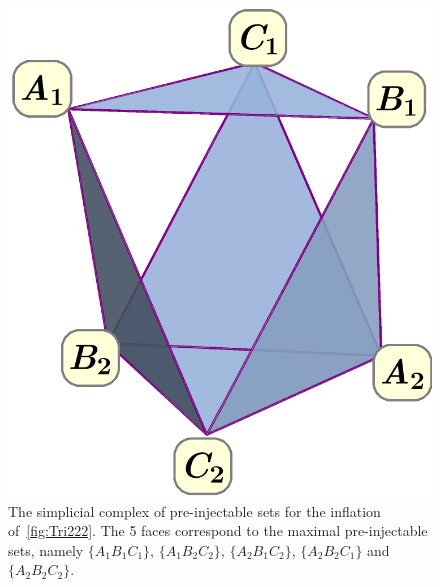 {\begin{figure}[t]
\begin{minipage}[t]{0.3\linewidth}
\includegraphics[scale=0.25]{simplicialcomplex.pdf}
\caption{The simplicial complex of pre-injectable sets for the inflation of~\cref{fig:Tri222}. The 5 faces correspond to the maximal pre-injectable sets, namely $\{A_1 B_1 C_1\}$, $\{A_1 B_2 C_2\}$, $\{A_2 B_1 C_2\}$, $\{A_2 B_2 C_1\}$ and $\{A_2 B_2 C_2\}$.}\label{fig:simplicialcomplex222}
\end{minipage}
\end{figure}


}
